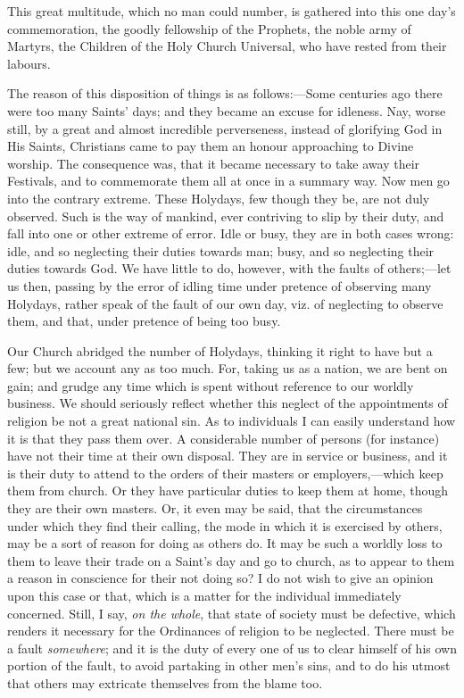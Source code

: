 This great multitude, which no man could number, is gathered into
this one day's commemoration, the goodly fellowship of the Prophets, the
noble army of Martyrs, the Children of the Holy Church Universal, who
have rested from their labours.

The reason of this disposition of things is as follows:—Some
centuries ago there were too many Saints' days; and they became an
excuse for idleness. Nay, worse still, by a great and almost incredible
perverseness, instead of glorifying God in His Saints, Christians came
to pay them an honour approaching to Divine worship. The consequence
was, that it became necessary to take away their Festivals, and to
commemorate them all at once in a summary way. Now men go into the
contrary extreme. These Holydays, few though they be, are not duly
observed. Such is the way of mankind, ever contriving to slip by their
duty, and fall into one or other extreme of error. Idle or busy, they
are in both cases wrong: idle, and so neglecting their duties towards
man; busy, and so neglecting their duties towards God. We have little to
do, however, with the faults of others;—let us then, passing by the
error of idling time under pretence of observing many Holydays, rather
speak of the fault of our own day, viz. of neglecting to observe them,
and that, under pretence of being too busy.

Our Church abridged the number of Holydays, thinking it right to have
but a few; but we account any as too much. For, taking us as a nation,
we are bent on gain; and grudge any time which is spent without
reference to our worldly business. We should seriously reflect whether
this neglect of the appointments of religion be not a great national
sin. As to individuals I can easily understand how it is that they pass
them over. A considerable number of persons (for instance) have not
their time at their own disposal. They are in service or business, and
it is their duty to attend to the orders of their masters or employers,—which
keep them from church. Or they have particular duties to keep them at
home, though they are their own masters. Or, it even may be said, that
the circumstances under which they find their calling, the mode in which
it is exercised by others, may be a sort of reason for doing as others
do. It may be such a worldly loss to them to leave their trade on a
Saint's day and go to church, as to appear to them a reason in
conscience for their not doing so? I do not wish to give an opinion upon
this case or that, which is a matter for the individual immediately
concerned. Still, I say, \emph{on the whole}, that state of society must
be defective, which renders it necessary for the Ordinances of religion
to be neglected. There must be a fault \emph{somewhere}; and it is the
duty of every one of us to clear himself of his own portion of the
fault, to avoid partaking in other men's sins, and to do his utmost that
others may extricate themselves from the blame too.

